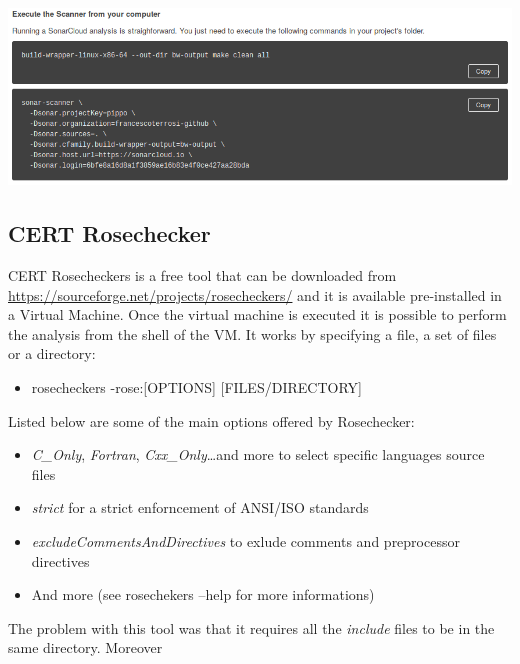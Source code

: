 \begin{minipage}{\linewidth}
	\includegraphics[width=\textwidth]{img/sonarqube-scan.png}
\end{minipage}

\subsection{CERT Rosechecker}

CERT Rosecheckers is a free tool that can be downloaded from \url{https://sourceforge.net/projects/rosecheckers/} and it is available pre-installed in a Virtual Machine.\newline
Once the virtual machine is executed it is possible to perform the analysis from the shell of the VM. It works by specifying a file, a set of files or a directory:

\begin{itemize}
	\item rosecheckers -rose:[OPTIONS] [FILES/DIRECTORY]
\end{itemize}

Listed below are some of the main options offered by Rosechecker:

\begin{itemize}
	\item \textsl{C\_Only}, \textsl{Fortran}, \textsl{Cxx\_Only}\dots and more to select specific languages source files
	\item \textsl{strict} for a strict enforncement of ANSI/ISO standards
	\item \textsl{excludeCommentsAndDirectives} to exlude comments and preprocessor directives
	\item And more (see rosechekers --help for more informations)
\end{itemize}

The problem with this tool was that it requires all the \textsl{include} files to be in the same directory. Moreover
